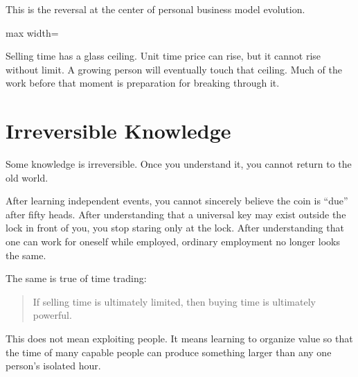 This is the reversal at the center of personal business model evolution.

\begin{center}
\begin{adjustbox}{max width=\linewidth}
\end{adjustbox}
\end{center}

Selling time has a glass ceiling. Unit time price can rise, but it cannot rise without limit. A growing person will eventually touch that ceiling. Much of the work before that moment is preparation for breaking through it.

\section*{Irreversible Knowledge}

Some knowledge is irreversible. Once you understand it, you cannot return to the old world.

After learning independent events, you cannot sincerely believe the coin is ``due'' after fifty heads. After understanding that a universal key may exist outside the lock in front of you, you stop staring only at the lock. After understanding that one can work for oneself while employed, ordinary employment no longer looks the same.

The same is true of time trading:

\begin{quote}
If selling time is ultimately limited, then buying time is ultimately powerful.
\end{quote}

This does not mean exploiting people. It means learning to organize value so that the time of many capable people can produce something larger than any one person's isolated hour.

